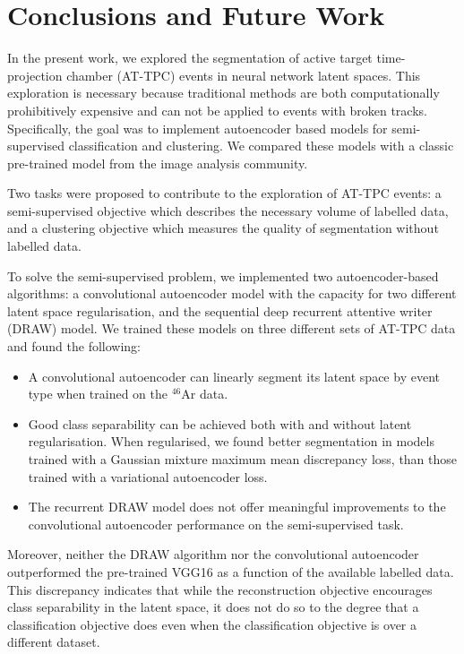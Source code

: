 \chapter{Conclusions and Future Work}


In the present work, we explored the segmentation of active target time-projection chamber (AT-TPC) events in neural network latent spaces. This exploration is necessary because traditional methods are both computationally prohibitively expensive and can not be applied to events with broken tracks. Specifically, the goal was to implement autoencoder based models for semi-supervised classification and clustering. We compared these models with a classic pre-trained model from the image analysis community.

Two tasks were proposed to contribute to the exploration of  AT-TPC events: a semi-supervised objective which describes the necessary volume of labelled data, and a clustering objective which measures the quality of segmentation without labelled data. 

To solve the semi-supervised problem, we implemented two autoencoder-based algorithms: a convolutional autoencoder model with the capacity for two different latent space regularisation, and the sequential deep recurrent attentive writer (DRAW) model. We trained these models on three different sets of AT-TPC data and found the following:

\begin{itemize}
\item A convolutional autoencoder can linearly segment its latent space by event type when trained on the ${}^{46}$Ar data.
\item Good class separability can be achieved both with and without latent regularisation.  When regularised, we found better segmentation in models trained with a Gaussian mixture maximum mean discrepancy loss, than those trained with a variational autoencoder loss. 
\item The recurrent DRAW  model does not offer meaningful improvements to the convolutional autoencoder performance on the semi-supervised task. 
\end{itemize}

Moreover, neither the DRAW algorithm nor the convolutional autoencoder outperformed the pre-trained VGG16 as a function of the available labelled data. This discrepancy indicates that while the reconstruction objective encourages class separability in the latent space, it does not do so to the degree that a classification objective does even when the classification objective is over a different dataset. 

